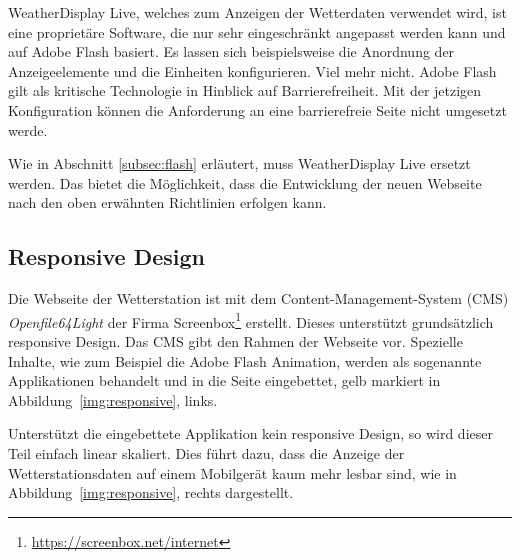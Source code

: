 \noindent
WeatherDisplay Live, welches zum Anzeigen der Wetterdaten verwendet wird, ist eine proprietäre Software, die nur sehr eingeschränkt angepasst werden kann und auf Adobe Flash basiert. Es lassen sich beispielsweise die Anordnung der Anzeigeelemente und die Einheiten konfigurieren. Viel mehr nicht.  Adobe Flash gilt als kritische Technologie in Hinblick auf Barrierefreiheit. Mit der jetzigen Konfiguration können die Anforderung an eine barrierefreie Seite nicht umgesetzt werde.
\newline

\noindent
Wie in Abschnitt \ref{subsec:flash} erläutert, muss WeatherDisplay Live ersetzt werden. Das bietet die Möglichkeit, dass die Entwicklung der neuen Webseite nach den oben erwähnten Richtlinien erfolgen kann.


\subsection{Responsive Design}
Die Webseite der Wetterstation ist mit dem Content-Management-System (CMS) \textit{Openfile64Light} der Firma Screenbox\footnote{ \url{https://screenbox.net/internet}}  erstellt. Dieses unterstützt grundsätzlich responsive Design. Das CMS gibt den Rahmen der Webseite vor. Spezielle Inhalte, wie zum Beispiel die Adobe Flash Animation, werden als sogenannte Applikationen behandelt und in die Seite eingebettet, gelb markiert in Abbildung~\ref{img:responsive}, links.
\newline

\noindent
Unterstützt die eingebettete Applikation kein responsive Design, so wird dieser Teil einfach linear skaliert. Dies führt dazu, dass die Anzeige der Wetterstationsdaten auf einem Mobilgerät kaum mehr lesbar sind, wie in Abbildung~\ref{img:responsive}, rechts dargestellt.
\newline

